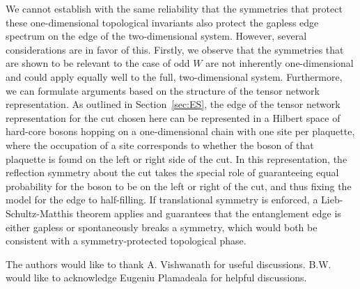 We cannot establish with the same reliability that the symmetries that protect these one-dimensional topological
invariants also protect the gapless edge spectrum on the edge of the two-dimensional system. However, several
considerations are in favor of this.
Firstly, we observe that the symmetries that are shown to be relevant to the case of odd $W$ are not
inherently one-dimensional and could apply equally well to the full, two-dimensional system.
Furthermore, we can formulate arguments based on the structure of the tensor network representation.
As outlined in Section~\ref{sec:ES}, the edge of the tensor network representation for the cut chosen here
can be represented in a Hilbert space of hard-core bosons hopping on a one-dimensional chain with one site
per plaquette, where the occupation of a site corresponds to whether the boson of that plaquette is found
on the left or right side of the cut. In this representation, the reflection symmetry about the cut takes
the special role of guaranteeing equal probability for the boson to be on the left or right of the cut, and thus fixing
the model for the edge to half-filling. If translational symmetry is enforced, a Lieb-Schultz-Matthis
theorem applies and guarantees that the entanglement edge is either gapless or spontaneously breaks a
symmetry, which would both be consistent with a symmetry-protected topological phase.



\acknowledgements
The authors would like to thank A. Vishwanath for useful discussions.
B.W. would like to acknowledge Eugeniu Plamadeala for helpful discussions.
